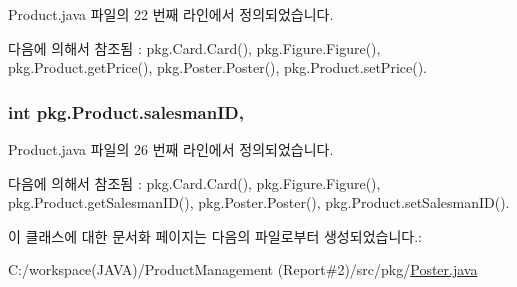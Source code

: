 Product.\+java 파일의 22 번째 라인에서 정의되었습니다.



다음에 의해서 참조됨 \+:  pkg.\+Card.\+Card(), pkg.\+Figure.\+Figure(), pkg.\+Product.\+get\+Price(), pkg.\+Poster.\+Poster(), pkg.\+Product.\+set\+Price().

\subsubsection[{\texorpdfstring{salesman\+ID}{salesmanID}}]{\setlength{\rightskip}{0pt plus 5cm}int pkg.\+Product.\+salesman\+ID\hspace{0.3cm}{\ttfamily [protected]}, {\ttfamily [inherited]}}\hypertarget{classpkg_1_1_product_aecf411b201022fca17571e9afbc76747}{}\label{classpkg_1_1_product_aecf411b201022fca17571e9afbc76747}


Product.\+java 파일의 26 번째 라인에서 정의되었습니다.



다음에 의해서 참조됨 \+:  pkg.\+Card.\+Card(), pkg.\+Figure.\+Figure(), pkg.\+Product.\+get\+Salesman\+I\+D(), pkg.\+Poster.\+Poster(), pkg.\+Product.\+set\+Salesman\+I\+D().



이 클래스에 대한 문서화 페이지는 다음의 파일로부터 생성되었습니다.\+:\begin{DoxyCompactItemize}
\item 
C\+:/workspace(\+J\+A\+V\+A)/\+Product\+Management (\+Report\#2)/src/pkg/\hyperlink{_poster_8java}{Poster.\+java}\end{DoxyCompactItemize}
